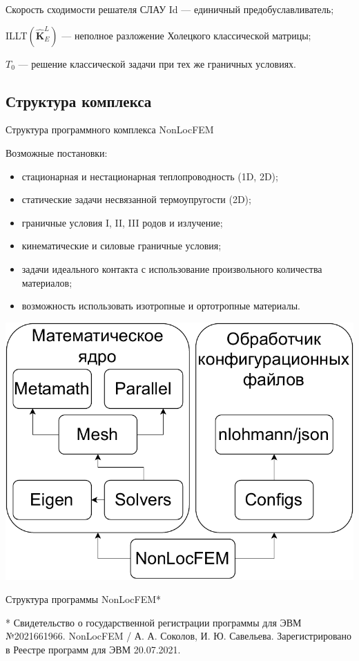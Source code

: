 \begin{frame}{Скорость сходимости решателя СЛАУ}
Id --- единичный предобуславливатель;

ILLT$\left( \widehat{\textbf{K}}^L_E \right)$ --- неполное разложение Холецкого классической матрицы;

$T_0$ --- решение классической задачи при тех же граничных условиях.
\end{frame}

\subsection{Структура комплекса}
\begin{frame}{Структура программного комплекса NonLocFEM}
\begin{minipage}{0.49\textwidth}
	Возможные постановки:
	\begin{itemize}
		\justifying
		\footnotesize
		\item стационарная и нестационарная теплопроводность (1D, 2D);
		\item статические задачи несвязанной термоупругости (2D);
		\item граничные условия I, II, III родов и излучение;
		\item кинематические и силовые граничные условия;
		\item задачи идеального контакта с использование произвольного количества материалов;
		\item возможность использовать изотропные и ортотропные материалы.
	\end{itemize}
\end{minipage}
\hfill
\begin{minipage}{0.49\textwidth}
	\centering
	\includegraphics[width=\textwidth]{pics/NonLocFEMSchema.pdf}
	
	Структура программы NonLocFEM*
\end{minipage}
\bigskip

\justifying
* Свидетельство о государственной регистрации программы для ЭВМ \\
    №2021661966. NonLocFEM / А. А. Соколов, И. Ю. Савельева. Зарегистрировано в Реестре программ для ЭВМ 20.07.2021.
\end{frame}


